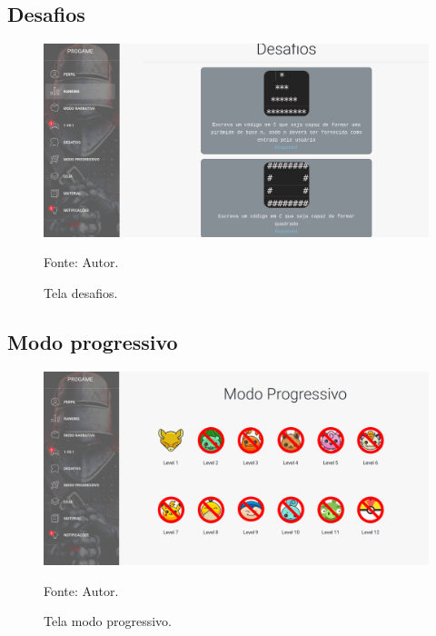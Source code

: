 \subsection{Desafios}
\begin{figure}[h]
	\centering
	\includegraphics[keepaspectratio=true,scale=0.32]{figuras/i.png}
	\caption{Tela desafios.}
	Fonte: Autor.
	\label{figurai}
\end{figure}

\subsection{Modo progressivo}
\begin{figure}[h]
	\centering
	\includegraphics[keepaspectratio=true,scale=0.32]{figuras/j.png}
	\caption{Tela modo progressivo.}
	Fonte: Autor.
	\label{figuraj}
\end{figure}

\pagebreak


